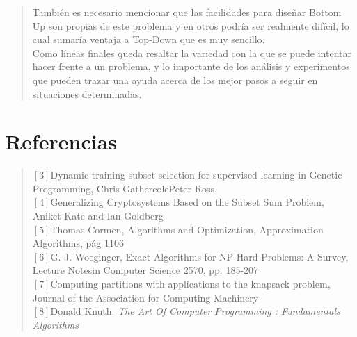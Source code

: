 \documentclass[7pt,a4paper]{article}
\begin{document}
\begin{verse}
También es necesario mencionar que las facilidades para diseñar Bottom Up son propias de este problema y en otros podría ser realmente difícil, lo cual sumaría ventaja a Top-Down que es muy sencillo.\\
Como líneas finales queda resaltar la variedad con la que se puede intentar hacer frente a un problema, y lo importante de los análisis y experimentos que pueden trazar una ayuda acerca de los mejor pasos a seguir en situaciones determinadas. 

\end{verse}

\section{Referencias}
\begin{verse}
$[3]$Dynamic training subset selection for supervised learning in Genetic Programming, Chris GathercolePeter Ross.\\
$[4]$Generalizing Cryptosystems Based on the Subset Sum Problem, Aniket Kate and Ian Goldberg\\
$[5]$Thomas Cormen, Algorithms and Optimization, Approximation Algorithms, pág 1106\\
$[6]$G. J. Woeginger, Exact Algorithms for NP-Hard Problems: A Survey, Lecture Notesin Computer Science 2570, pp. 185-207  \\
$[7]$Computing partitions with applications to the knapsack problem,  Journal of the Association for Computing Machinery\\
$[8]$Donald Knuth. \it{The Art Of Computer Programming : Fundamentals Algorithms}
\end{verse}
\end{document}
